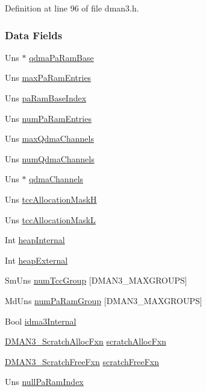 Definition at line 96 of file dman3.h.\subsubsection*{Data Fields}
\begin{CompactItemize}
\item 
Uns $\ast$ \hyperlink{struct_d_m_a_n3___params_766e441c25336fb3a36d56c711cb08e4}{qdma\-Pa\-Ram\-Base}
\item 
Uns \hyperlink{struct_d_m_a_n3___params_58339ef320bf8a83a2b995124965405e}{max\-Pa\-Ram\-Entries}
\item 
Uns \hyperlink{struct_d_m_a_n3___params_cd68bdec25ab7f38188f61bf2fda5ceb}{pa\-Ram\-Base\-Index}
\item 
Uns \hyperlink{struct_d_m_a_n3___params_cde436b501fefb284f4cf43d87dd9e0a}{num\-Pa\-Ram\-Entries}
\item 
Uns \hyperlink{struct_d_m_a_n3___params_c8625cdf0b069aea5d9456be100aef33}{max\-Qdma\-Channels}
\item 
Uns \hyperlink{struct_d_m_a_n3___params_354db3352d61cd71924bdd6c8827f5a5}{num\-Qdma\-Channels}
\item 
Uns $\ast$ \hyperlink{struct_d_m_a_n3___params_3ce746095fcc42779b01362ba9fe2359}{qdma\-Channels}
\item 
Uns \hyperlink{struct_d_m_a_n3___params_1866abe117288a1d94b9ac62039b7f46}{tcc\-Allocation\-Mask\-H}
\item 
Uns \hyperlink{struct_d_m_a_n3___params_ce9a03fc79f8cf2727f2753693a66caa}{tcc\-Allocation\-Mask\-L}
\item 
Int \hyperlink{struct_d_m_a_n3___params_1acba3008b12df10cad8b80bb5991e55}{heap\-Internal}
\item 
Int \hyperlink{struct_d_m_a_n3___params_5e397135231bc45e7e3ac6d4e1ae3166}{heap\-External}
\item 
Sm\-Uns \hyperlink{struct_d_m_a_n3___params_d431ed7c6e66d11a1c1cdbf9518494f0}{num\-Tcc\-Group} \mbox{[}DMAN3\_\-MAXGROUPS\mbox{]}
\item 
Md\-Uns \hyperlink{struct_d_m_a_n3___params_b722aece79c8c43eadd6b30d3a828a74}{num\-Pa\-Ram\-Group} \mbox{[}DMAN3\_\-MAXGROUPS\mbox{]}
\item 
Bool \hyperlink{struct_d_m_a_n3___params_c1550ea0e1f8b5442f88eccc395a491c}{idma3Internal}
\item 
\hyperlink{group___d_s_p_d_m_a_n3_gb88a4f4fc347844728e7c0d6b46c5ecf}{DMAN3\_\-Scratch\-Alloc\-Fxn} \hyperlink{struct_d_m_a_n3___params_5fd92c4be106cf2614490abffdd09b60}{scratch\-Alloc\-Fxn}
\item 
\hyperlink{group___d_s_p_d_m_a_n3_g5c51dee2c06d775005a8cf4db004782f}{DMAN3\_\-Scratch\-Free\-Fxn} \hyperlink{struct_d_m_a_n3___params_383ff9a30cfc36cb8ab0b0d8a4701fce}{scratch\-Free\-Fxn}
\item 
Uns \hyperlink{struct_d_m_a_n3___params_35fa90f301f8b215cb385a78d4fb215d}{null\-Pa\-Ram\-Index}
\end{CompactItemize}


